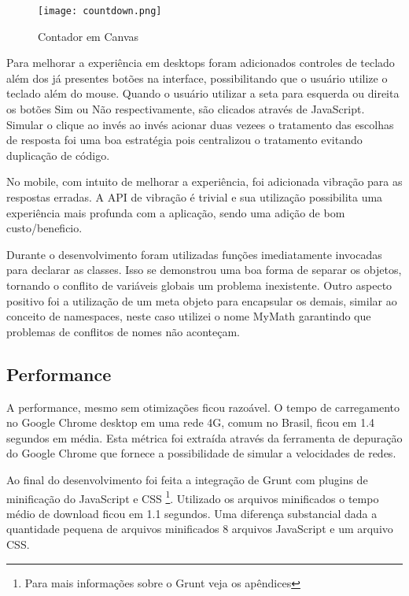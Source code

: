\begin{figure}
    \centering
    \texttt{[image: countdown.png]}
	\caption{Contador em Canvas}
    \label{fig:counter}
\end{figure}

Para melhorar a experiência em desktops foram adicionados controles de
teclado além dos já presentes botões na interface, possibilitando que
o usuário utilize o teclado além do mouse. Quando o usuário utilizar
a seta para esquerda ou direita os botões Sim ou Não respectivamente,
são clicados através de JavaScript. Simular o clique ao invés ao
invés acionar duas vezees o tratamento das escolhas de resposta foi uma boa
estratégia pois centralizou o tratamento evitando duplicação de código.

No mobile, com intuito de melhorar a experiência, foi adicionada
vibração para as respostas erradas. A API de vibração é trivial e sua 
utilização possibilita uma experiência mais profunda com a aplicação, sendo 
uma adição de bom custo/beneficio.

Durante o desenvolvimento foram utilizadas funções imediatamente
invocadas para declarar as classes. Isso se demonstrou uma boa forma
de separar os objetos, tornando o conflito de variáveis globais um
problema inexistente. Outro aspecto positivo foi a utilização de
um meta objeto para encapsular os demais, similar ao conceito de
namespaces, neste caso utilizei o nome MyMath garantindo que problemas
de conflitos de nomes não aconteçam.


\subsection{Performance}

A performance, mesmo sem otimizações ficou razoável. O tempo de
carregamento no Google Chrome desktop em uma rede 4G, comum no Brasil,
ficou em 1.4 segundos em média. Esta métrica foi extraída através da
ferramenta de depuração do Google Chrome que fornece a possibilidade
de simular a velocidades de redes.

Ao final do desenvolvimento foi feita a integração de Grunt com
plugins de minificação do JavaScript e CSS \footnote{Para mais
informações sobre o Grunt veja os apêndices}. Utilizado os arquivos
minificados o tempo médio de download ficou em 1.1 segundos. Uma
diferença substancial dada a quantidade pequena de arquivos minificados
8 arquivos JavaScript e um arquivo CSS.

